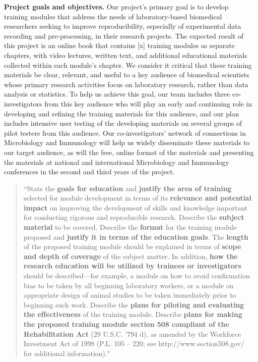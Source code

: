 \documentclass[pdftex,english,11pt,parskip=half]{scrartcl}
\begin{document}
\textbf{Project goals and objectives.} Our project's primary goal is to develop training modules that address the needs of laboratory-based biomedical researchers seeking to improve reproducibility, especially of experimental data recording and pre-processing, in their research projects. The expected result of this project is an online book that contains [x] training modules as separate chapters, with video lectures, written text, and additional educational materials collected within each module's chapter. We consider it critical that these training materials be clear, relevant, and useful to a key audience of biomedical scientists whose primary research activities focus on laboratory research, rather than data analysis or statistics. To help us achieve this goal, our team includes three co-investigators from this key audience who will play an early and continuing role in developing and refining the training materials for this audience, and our plan includes intensive user testing of the developing materials on several groups of pilot testers from this audience. Our co-investigators' network of connections in Microbiology and Immunology will help us widely disseminate these materials to our target audience, as will the free, online format of the materials and presenting the materials at national and international Microbiology and Immunology conferences in the second and third years of the project.

\begin{quotation}
``State the \textbf{goals for education} and \textbf{justify the area of training} selected for module development in terms of its \textbf{relevance and potential impact} on improving the development of skills and knowledge important for conducting rigorous and reproducible research. Describe the \textbf{subject material} to be covered.  Describe the \textbf{format} for the training module proposed and \textbf{justify it in terms of the education goals}.  The \textbf{length} of the proposed training module should be explained in terms of \textbf{scope and depth of coverage} of the subject matter.  In addition, \textbf{how the research education will be utilized by trainees or investigators} should be described---for example, a module on how to avoid confirmation bias to be taken by all beginning laboratory workers, or a module on appropriate design of animal studies to be taken immediately prior to beginning such work.  Describe the \textbf{plans for piloting and evaluating the effectiveness} of the training module. Describe \textbf{plans for making the proposed training module section 508 compliant of the Rehabilitation Act} (29 U.S.C. '794 d), as amended by the Workforce Investment Act of 1998 (P.L. 105 – 220; see http://www.section508.gov/ for additional information)."
\end{quotation}
\end{document}
